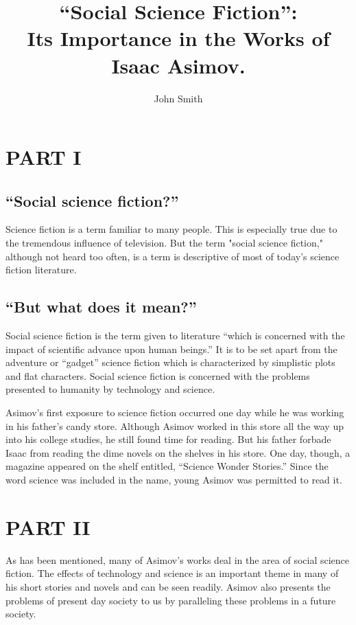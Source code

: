 \documentclass[12pt, a4paper]{article}
\title{``Social Science Fiction'': \\
Its Importance in the Works of Isaac Asimov.}
\author{John Smith}
\begin{document}
\maketitle

\tableofcontents

\section{PART I}


\subsection{``Social science fiction?''}

Science fiction is a term familiar to many people.  This is especially
true due to the tremendous influence of television. But the term
"social science fiction," although not heard too often, is a term is
descriptive of most of today's science fiction literature.


\subsection{``But what does it mean?''}

Social science fiction is the term given to literature ``which is
concerned with the impact of scientific advance upon human beings.'' 
It is to be set apart from the adventure or ``gadget'' science fiction
which is characterized by simplistic plots and flat characters.
Social science fiction is concerned with the problems presented to
humanity by technology and science.

Asimov's first exposure to science fiction occurred one day while he
was working in his father's candy store.  Although Asimov worked in
this store all the way up into his college studies, he still found
time for reading.  But his father forbade Isaac from reading the dime
novels on the shelves in his store.  One day, though, a magazine
appeared on the shelf entitled, ``Science Wonder Stories.'' Since the
word science was included in the name, young Asimov was permitted to
read it.


\section{PART II}


As has been mentioned, many of Asimov's works deal in the area of
social science fiction.  The effects of technology and science is an
important theme in many of his short stories and novels and can be
seen readily.  Asimov also presents the problems of present day
society to us by paralleling these problems in a future society.
\end{document}
